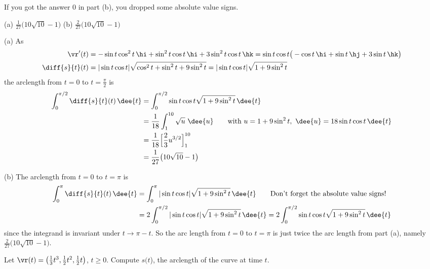 \begin{hint} 
	If you got the answer $0$ in part (b), you dropped some absolute value signs.
\end{hint}

\begin{answer} 
	(a) $\frac{1}{27}\big(10\sqrt{10}-1\big)$\qquad
	(b) $\frac{2}{27}\big(10\sqrt{10}-1\big)$
\end{answer}

\begin{solution} (a)
	As
	\begin{align*}
	\vr'(t) & = -\sin t\cos^2 t\,\hi + \sin^2 t\cos t\,\hi + 3\sin^2 t\cos t\,\hk
	= \sin t\cos t\big(-\cos t\,\hi +\sin t\,\hj +3\sin t\,\hk\big) \\
	\diff{s}{t}(t) & = |\sin t\cos t|\sqrt{\cos^2 t + \sin ^2 t + 9\sin^2 t}
	= |\sin t\cos t|\sqrt{1+ 9\sin^2 t}
	\end{align*}
	the arclength from $t = 0$ to $t = \frac{\pi}{2}$ is
	\begin{align*}
	\int_0^{\pi/2} \diff{s}{t}(t)\,\dee{t}
	&=\int_0^{\pi/2} \sin t\cos t \sqrt{1+ 9\sin^2 t}\,\dee{t} \\
	&=\frac{1}{18}\int_1^{10} \sqrt{u}\ \dee{u} \qquad
	\text{with } u = 1+ 9\sin^2 t,\ \dee{u}  = 18\sin t\cos t\,\dee{t}\\
	&=\frac{1}{18}\Big[\frac{2}{3}u^{3/2}\Big]_1^{10}\\
	&=\frac{1}{27}\big(10\sqrt{10}-1\big)
	\end{align*}
	
	(b) The arclength from $t = 0$ to $t = \pi$ is
	\begin{align*}
	\int_0^{\pi} \diff{s}{t}(t)\,\dee{t}
	&=\int_0^{\pi} |\sin t\cos t| \sqrt{1+ 9\sin^2 t}\,\dee{t} 
	\qquad\text{Don't forget the absolute value signs!}\\
	&=2\int_0^{\pi/2} |\sin t\cos t| \sqrt{1+ 9\sin^2 t}\,\dee{t} 
	= 2\int_0^{\pi/2} \sin t\cos t \sqrt{1+ 9\sin^2 t}\,\dee{t} 
	\end{align*}
	since the integrand is invariant under $t\rightarrow\pi-t$. So the arc length
	from $t = 0$ to $t = \pi$ is just twice the arc length from part (a), namely $\frac{2}{27}\big(10\sqrt{10}-1\big)$.
	
\end{solution}
\begin{question}[M317 2017D] %
Let $\vr(t)=\big(\frac{1}{3}t^3,\frac{1}{2}t^2,\frac{1}{2}t\big)$,
$t\ge 0$. Compute $s(t$), the arclength of the curve at time
$t$.
\end{question}

